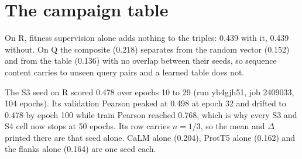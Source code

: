 \section{The campaign table}
\label{sec:table}

\begin{table}[H]
\centering
\footnotesize
\caption{Every cell of the campaign. A number is a finished seed's score; \textit{run, ep
$k$} is the running job and the last validation epoch it logged; \textit{q$k$} is position
$k$ in the queue of Table~\ref{tab:queue}; n/a marks a seed slot the cell does not use.
Seeds a, b, c are 1, 2, 3, except in the rows inherited from the first disjoint round,
where they are 42, 1, 2. $n$ is seeds scored over seeds planned, $\Delta$ the mean minus
the comparator cell's mean (Section~\ref{sec:design}), and the best mean of each block is
bold. Generated by \texttt{mmli\_campaign\_plan.py}.}
\label{tab:campaign}

\end{table}

On R, fitness supervision alone adds nothing to the triples: 0.439 with it, 0.439 without.
On Q the composite (0.218) separates from the random vector (0.152) and from the table
(0.136) with no overlap between their seeds, so sequence content carries to unseen query
pairs and a learned table does not.

The S3 seed on R scored 0.478 over epochs 10 to 29 (run yb4gjh51, job 2409033, 104 epochs).
Its validation Pearson peaked at 0.498 at epoch 32 and drifted to 0.478 by epoch 100 while
train Pearson reached 0.768, which is why every S3 and S4 cell now stops at 50 epochs.
Its row carries $n = 1/3$, so the mean and $\Delta$ printed there are that seed alone.
CaLM alone (0.204), ProtT5 alone (0.162) and the flanks alone (0.164) are one seed each.
